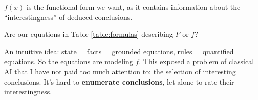 $f(x)$ is the functional form we want, as it contains information about the ``interestingness'' of deduced conclusions.

Are our equations in Table \ref{table:formulas} describing $F$ or $f$?  

An intuitive idea:  state = facts = grounded equations, rules = quantified equations.  So the equations are modeling $f$.  This exposed a problem of classical AI that I have not paid too much attention to:  the selection of interesting conclusions.  It's hard to \textbf{enumerate conclusions}, let alone to rate their interestingness.

